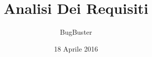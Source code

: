 



\title{\textbf{Analisi Dei Requisiti}}
\author{BugBuster}

\date{18 Aprile 2016}




\makeFrontPage

\tableofcontents





